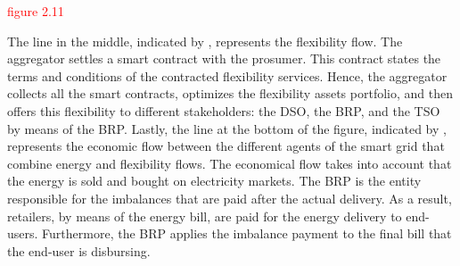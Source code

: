 \textcolor{red}{figure 2.11}

The line in the middle, indicated by , represents the flexibility flow. The aggregator settles a smart contract with the prosumer. This contract states the terms and conditions of the contracted flexibility services. Hence, the aggregator collects all the smart contracts, optimizes the flexibility assets portfolio, and then offers this flexibility to different stakeholders: the DSO, the BRP, and the TSO by means of the BRP. 
Lastly, the line at the bottom of the figure, indicated by , represents the economic flow between the different agents of the smart grid that combine energy and flexibility flows. The economical flow takes into account that the energy is sold and bought on electricity markets. The BRP is the entity responsible for the imbalances that are paid after the actual delivery. As a result, retailers, by means of the energy bill, are paid for the energy delivery to end-users. Furthermore, the BRP applies the imbalance payment to the final bill that the end-user is disbursing.

